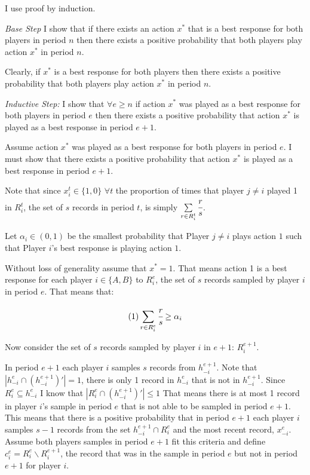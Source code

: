 \documentclass{article}
\begin{document}
I use proof by induction.

\vskip12pt

\textit{Base Step} I show that if there exists an action $x^*$ that is a best response for both players in period $n$ then there exists a positive probability that both players play action $x^*$ in period $n$.

\vskip6pt

Clearly, if $x^*$ is a best response for both players then there exists a positive probability that both players play action $x^*$ in period $n$.

\vskip12pt

\textit{Inductive Step:} I show that $\forall e \geq n$ if action $x^*$ was played as a best response for both players in period $e$ then there exists a positive probability that action $x^*$ is played as a best response in period $e+1$.

\vskip6pt

Assume action $x^*$ was played as a best response for both players in period $e$. I must show that there exists a positive probability that action $x^*$ is played as a best response in period $e+1$.

\vskip6pt

Note that since $x_i^t \in \{1,0\}$ \hspace{4pt} $\forall t$ the proportion of times that player $j \neq i$ played 1 in $R_i^t$, the set of $s$ records in period $t$, is simply $\sum\limits_{r \in R_i^t} \cfrac{r}{s}$.

\vskip6pt

Let $\alpha_i \in (0,1)$ be the smallest probability that Player $j \neq i$ plays action $1$ such that Player $i$'s best response is playing action $1$.

\vskip6pt

Without loss of generality assume that $x^{*}=1$. That means action 1 is a best response for each player $i \in \{A,B\}$ to $R_i^{e}$, the set of $s$ records sampled by player $i$ in period $e$. That means that:

$$ (1) \sum\limits_{r \in R_i^{e}} \cfrac{r}{s} \geq \alpha_i$$

Now consider the set of $s$ records sampled by player $i$ in $e+1$: $R_i^{e+1}$.

In period $e+1$ each player $i$ samples $s$ records from $h_{-i}^{e+1}$. Note that $|h_{-i}^{e} \cap (h_{-i}^{e+1})'|=1$, there is only 1 record in $h_{-i}^{e}$ that is not in $h_{-i}^{e+1}$. Since $R_i^{e} \subseteq h_{-i}^{e}$ I know that $|R_i^{e} \cap (h_{-i}^{e+1})'| \leq 1$ That means there is at most 1 record in player $i$'s sample in period $e$ that is not able to be sampled in period $e+1$. This means that there is a positive probability that in period $e+1$ each player $i$ samples $s-1$ records from the set $h_{-i}^{e+1} \cap R_i^{e}$ and the most recent record, $x_{-i}^{e}$. Assume both players samples in period $e+1$ fit this criteria and define $c_i^{e}=R_i^e \backslash R_i^{e+1}$, the record that was in the sample in period $e$ but not in period $e+1$ for player $i$.
\end{document}
